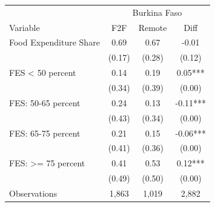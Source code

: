 \begin{tabular}{l*{3}c}
\hline\hline
 & \multicolumn{3}{c}{Burkina Faso}\\ 
Variable & F2F & Remote & Diff \\
\hline
Food Expenditure Share&0.69&0.67&-0.01\\
&(0.17)&(0.28)&(0.12)\\
FES < 50 percent&0.14&0.19&0.05***\\
&(0.34)&(0.39)&(0.00)\\
FES: 50-65 percent&0.24&0.13&-0.11***\\
&(0.43)&(0.34)&(0.00)\\
FES: 65-75 percent&0.21&0.15&-0.06***\\
&(0.41)&(0.36)&(0.00)\\
FES: >= 75 percent&0.41&0.53&0.12***\\
&(0.49)&(0.50)&(0.00)\\
\hline
Observations & 1,863 & 1,019 & 2,882 \\
\hline\hline
\end{tabular}
